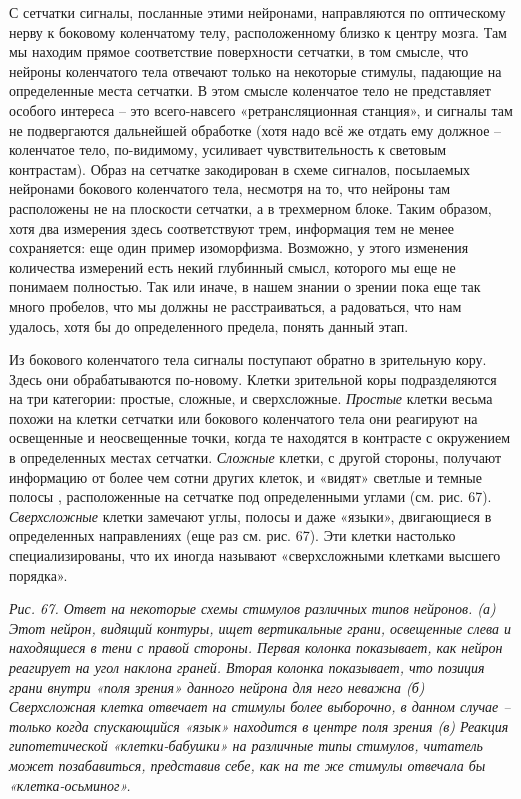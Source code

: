 \documentclass[../main.tex]{subfiles}
\begin{document}
С сетчатки сигналы, посланные этими нейронами, направляются по оптическому нерву к боковому коленчатому телу, расположенному близко к центру мозга. Там мы находим прямое соответствие поверхности сетчатки, в том смысле, что нейроны коленчатого тела отвечают только на некоторые стимулы, падающие на определенные места сетчатки. В этом смысле коленчатое тело не представляет особого интереса \--- это всего-навсего «ретрансляционная станция», и сигналы там не подвергаются дальнейшей обработке (хотя надо всё же отдать ему должное \--- коленчатое тело, по-видимому, усиливает чувствительность к световым контрастам). Образ на сетчатке закодирован в схеме сигналов, посылаемых нейронами бокового коленчатого тела, несмотря на то, что нейроны там расположены не на плоскости сетчатки, а в трехмерном блоке. Таким образом, хотя два измерения здесь соответствуют трем, информация тем не менее сохраняется: еще один пример изоморфизма. Возможно, у этого изменения количества измерений есть некий глубинный смысл, которого мы еще не понимаем полностью. Так или иначе, в нашем знании о зрении пока еще так много пробелов, что мы должны не расстраиваться, а радоваться, что нам удалось, хотя бы до определенного предела, понять данный этап.

Из бокового коленчатого тела сигналы поступают обратно в зрительную кору. Здесь они обрабатываются по-новому. Клетки зрительной коры подразделяются на три категории: простые, сложные, и сверхсложные. \emph{Простые} клетки весьма похожи на клетки сетчатки или бокового коленчатого тела они реагируют на освещенные и неосвещенные точки, когда те находятся в контрасте с окружением в определенных местах сетчатки. \emph{Сложные} клетки, с другой стороны, получают информацию от более чем сотни других клеток, и «видят» светлые и темные полосы , расположенные на сетчатке под определенными углами (см. рис. 67). \emph{Сверхсложные} клетки замечают углы, полосы и даже «языки», двигающиеся в определенных направлениях (еще раз см. рис. 67). Эти клетки настолько специализированы, что их иногда называют «сверхсложными клетками высшего порядка».

\emph{Рис. 67. Ответ на некоторые схемы стимулов различных типов нейронов. (а) Этот нейрон, видящий контуры, ищет вертикальные грани, освещенные слева и находящиеся в тени с правой стороны. Первая колонка показывает, как нейрон реагирует на угол наклона граней. Вторая колонка показывает, что позиция грани внутри «поля зрения» данного нейрона для него неважна (б) Сверхсложная клетка отвечает на стимулы более выборочно, в данном случае \--- только когда спускающийся «язык» находится в центре поля зрения (в) Реакция гипотетической «клетки-бабушки» на различные типы стимулов, читатель может позабавиться, представив себе, как на те же стимулы отвечала бы «клетка-осьминог».}
\end{document}
